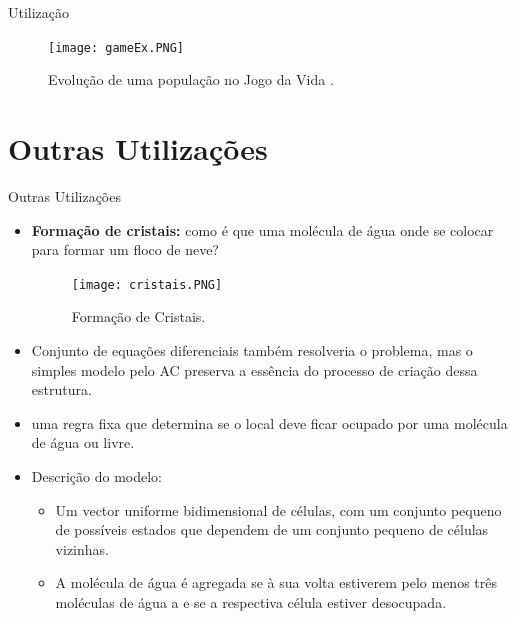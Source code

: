 \documentclass[compress, hide notes]{beamer}
\begin{document}
\begin{frame}{Utilização}
		
	\begin{figure}[h]
										
		\center
															
		\texttt{[image: gameEx.PNG]}
		\caption{Evolução de uma população no Jogo da Vida \cite{ufmg}.}
									
	\end{figure}
	
\end{frame}

\section{Outras Utilizações}

\begin{frame}{Outras Utilizações \cite{pt}}
		
	\begin{itemize}
	
		\item \textbf{Formação de cristais:} como é que uma molécula de água  onde se colocar para formar um floco de neve?
	
		\begin{figure}[h]
												
			\center
																	
			\texttt{[image: cristais.PNG]}
			\caption{Formação de Cristais.}
											
		\end{figure}
		
		\item Conjunto de equações diferenciais também resolveria o problema, mas o simples modelo pelo AC preserva a essência do processo de criação dessa estrutura.
        
        \item uma regra fixa que determina se o local deve ficar ocupado por uma molécula de água ou livre. 

        \item Descrição do modelo:
        
        \begin{itemize}
          \item Um vector uniforme bidimensional de células, com um conjunto pequeno de possíveis estados que dependem de um conjunto pequeno de
          células vizinhas. 
          \item A molécula de água é agregada se à sua volta estiverem pelo menos três moléculas de água a e se a  respectiva célula estiver desocupada.
        \end{itemize}
        
	\end{itemize}
	
\end{frame}
\end{document}
